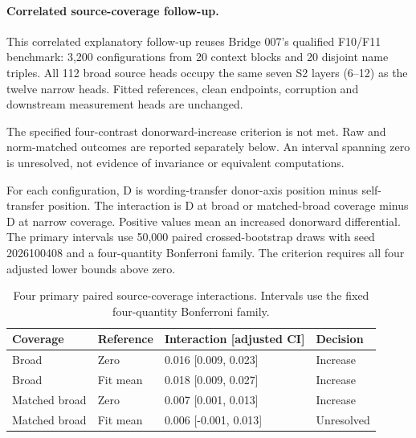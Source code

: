 \paragraph{Correlated source-coverage follow-up.} This correlated explanatory follow-up reuses Bridge 007's qualified F10/F11 benchmark: 3,200 configurations from 20 context blocks and 20 disjoint name triples. All 112 broad source heads occupy the same seven S2 layers (6--12) as the twelve narrow heads. Fitted references, clean endpoints, corruption and downstream measurement heads are unchanged.

The specified four-contrast donorward-increase criterion is not met. Raw and norm-matched outcomes are reported separately below. An interval spanning zero is unresolved, not evidence of invariance or equivalent computations.

For each configuration, D is wording-transfer donor-axis position minus self-transfer position. The interaction is D at broad or matched-broad coverage minus D at narrow coverage. Positive values mean an increased donorward differential. The primary intervals use 50,000 paired crossed-bootstrap draws with seed 2026100408 and a four-quantity Bonferroni family. The criterion requires all four adjusted lower bounds above zero.

\begin{table}[htbp]
\centering\footnotesize
\setlength{\tabcolsep}{3pt}
\caption{Four primary paired source-coverage interactions. Intervals use the fixed four-quantity Bonferroni family.}
\label{tab:b008-primary}
\begin{tabular}{@{}llll@{}}
\toprule
Coverage & Reference & Interaction [adjusted CI] & Decision \\
\midrule
Broad & Zero & 0.016 [0.009, 0.023] & Increase \\
Broad & Fit mean & 0.018 [0.009, 0.027] & Increase \\
Matched broad & Zero & 0.007 [0.001, 0.013] & Increase \\
Matched broad & Fit mean & 0.006 [-0.001, 0.013] & Unresolved \\
\bottomrule
\end{tabular}
\end{table}

